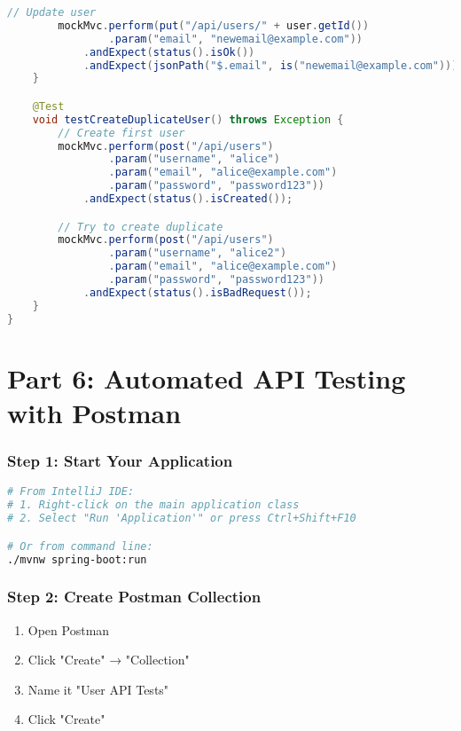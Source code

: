 \documentclass[12pt,a4paper]{article}
\begin{document}
\begin{lstlisting}[language=java, caption=UserControllerIntegrationTest.java - Full Stack Tests]
        // Update user
        mockMvc.perform(put("/api/users/" + user.getId())
                .param("email", "newemail@example.com"))
            .andExpect(status().isOk())
            .andExpect(jsonPath("$.email", is("newemail@example.com")));
    }

    @Test
    void testCreateDuplicateUser() throws Exception {
        // Create first user
        mockMvc.perform(post("/api/users")
                .param("username", "alice")
                .param("email", "alice@example.com")
                .param("password", "password123"))
            .andExpect(status().isCreated());

        // Try to create duplicate
        mockMvc.perform(post("/api/users")
                .param("username", "alice2")
                .param("email", "alice@example.com")
                .param("password", "password123"))
            .andExpect(status().isBadRequest());
    }
}
\end{lstlisting}

\newpage

\part{Part 6: Automated API Testing with Postman}

\section{Step 1: Start Your Application}

\begin{lstlisting}[language=bash, caption=Start Spring Boot Application]
# From IntelliJ IDE:
# 1. Right-click on the main application class
# 2. Select "Run 'Application'" or press Ctrl+Shift+F10

# Or from command line:
./mvnw spring-boot:run
\end{lstlisting}

\section{Step 2: Create Postman Collection}

\begin{enumerate}
    \item Open Postman
    \item Click "Create" → "Collection"
    \item Name it "User API Tests"
    \item Click "Create"
\end{enumerate}
\end{document}
